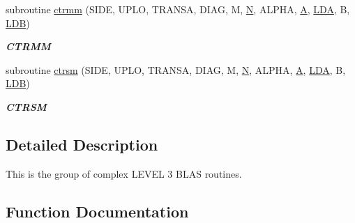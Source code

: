 \begin{DoxyCompactItemize}
subroutine \hyperlink{group__complex__blas__level3_gad7c297c05b482699b6d60a29c8d4a165}{ctrmm} (S\+I\+D\+E, U\+P\+L\+O, T\+R\+A\+N\+S\+A, D\+I\+A\+G, M, \hyperlink{polmisc_8c_a0240ac851181b84ac374872dc5434ee4}{N}, A\+L\+P\+H\+A, \hyperlink{classA}{A}, \hyperlink{example__user_8c_ae946da542ce0db94dced19b2ecefd1aa}{L\+D\+A}, B, \hyperlink{example__user_8c_a50e90a7104df172b5a89a06c47fcca04}{L\+D\+B})
\begin{DoxyCompactList}\small\item\em {\bfseries C\+T\+R\+M\+M} \end{DoxyCompactList}\item 
subroutine \hyperlink{group__complex__blas__level3_gaf33844c7fd27e5434496d2ce0c1fc9d4}{ctrsm} (S\+I\+D\+E, U\+P\+L\+O, T\+R\+A\+N\+S\+A, D\+I\+A\+G, M, \hyperlink{polmisc_8c_a0240ac851181b84ac374872dc5434ee4}{N}, A\+L\+P\+H\+A, \hyperlink{classA}{A}, \hyperlink{example__user_8c_ae946da542ce0db94dced19b2ecefd1aa}{L\+D\+A}, B, \hyperlink{example__user_8c_a50e90a7104df172b5a89a06c47fcca04}{L\+D\+B})
\begin{DoxyCompactList}\small\item\em {\bfseries C\+T\+R\+S\+M} \end{DoxyCompactList}\end{DoxyCompactItemize}


\subsection{Detailed Description}
This is the group of complex L\+E\+V\+E\+L 3 B\+L\+A\+S routines. 

\subsection{Function Documentation}
\hypertarget{group__complex__blas__level3_gac4e11e8e8a4b0c802d2229b08da341f6}{}
